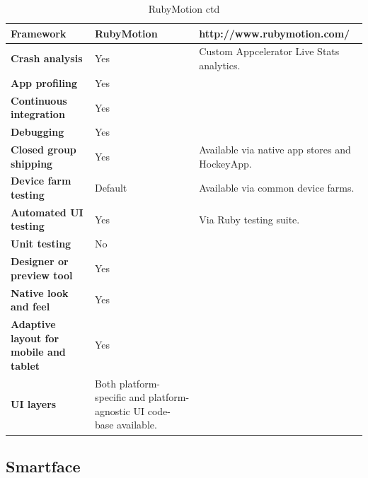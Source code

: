 \documentclass[english,master,public,dept460,male,cpdeclaration,oneside]{diploma}
\begin{document}
\begin{table}[!h]
	\centering
	\caption{RubyMotion ctd}
	\begin{tabular}{p{} | p{} | p{}}
		\toprule		
		\textbf{Framework} & \textbf{RubyMotion} & http://www.rubymotion.com/ \\
		\midrule
		\textbf{Crash analysis} & Yes & Custom Appcelerator Live Stats analytics. \\			
		\midrule
		\textbf{App profiling} & Yes & \\			
		\midrule
		\textbf{Continuous integration} & Yes & \\			
		\midrule
		\textbf{Debugging} & Yes & \\			
		\midrule
		\textbf{Closed group shipping} & Yes & Available via native app stores and HockeyApp. \\			
		\midrule
		\textbf{Device farm testing} & Default & Available via common device farms. \\			
		\midrule
		\textbf{Automated UI testing} & Yes & Via Ruby testing suite. \\			
		\midrule
		\textbf{Unit testing} & No & \\			
		\midrule
		\textbf{Designer or preview tool} & Yes & \\			
		\midrule
		\textbf{Native look and feel} & Yes & \\			
		\midrule
		\textbf{Adaptive layout for mobile and tablet} & Yes & \\			
		\midrule		
		\textbf{UI layers} & Both platform-specific and platform-agnostic UI code-base available. & \\			
		\midrule
	\end{tabular}
\end{table}

\clearpage
\subsection{Smartface}
\end{document}
